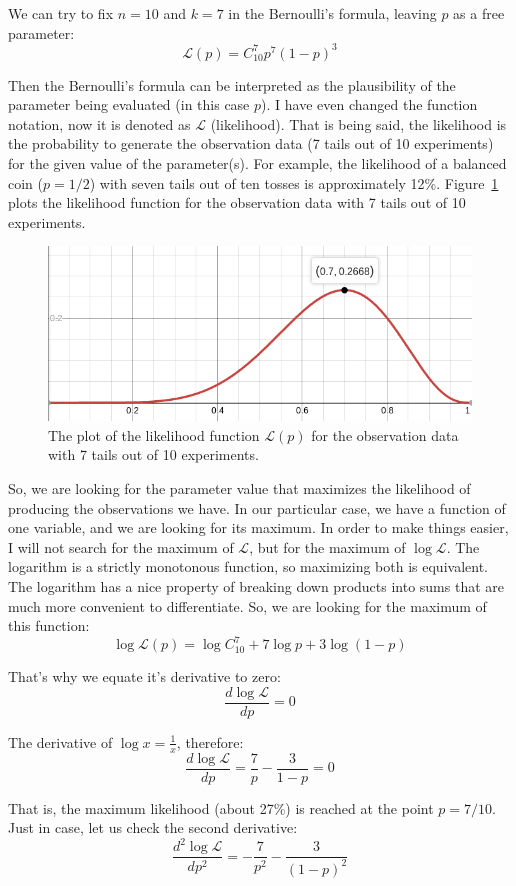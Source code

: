 \documentclass[notitlepage]{report}
\begin{document}
We can try to fix $n=10$ and $k=7$ in the Bernoulli's formula, leaving $p$ as a free parameter:
$$\mathcal{L}(p) = C_{10}^7 p^7 (1-p)^3$$

Then the Bernoulli's formula can be interpreted as the plausibility of the parameter being evaluated (in this case $p$).
I have even changed the function notation, now it is denoted as $\mathcal L$ (likelihood).
That is being said, the likelihood is the probability to generate the observation data (7 tails out of 10 experiments) for the given value of the parameter(s).
For example, the likelihood of a balanced coin ($p=1/2$) with seven tails out of ten tosses is approximately 12\%. 
Figure~\ref{fig:likelihood} plots the likelihood function for the observation data with 7 tails out of 10 experiments.

\begin{figure}[htb!]
\centering
\includegraphics[width=.5\columnwidth]{likehood-07.png}
\caption{The plot of the likelihood function $\mathcal{L}(p)$ for the observation data with 7 tails out of 10 experiments.}
\label{fig:likelihood}
\end{figure}

So, we are looking for the parameter value that maximizes the likelihood of producing the observations we have.
In our particular case, we have a function of one variable, and we are looking for its maximum.
In order to make things easier, I will not search for the maximum of $\mathcal L$, but for the maximum of $\log \mathcal L$.
The logarithm is a strictly monotonous function, so maximizing both is equivalent.
The logarithm has a nice property of breaking down products into sums that are much more convenient to differentiate.
So, we are looking for the maximum of this function:
$$\log \mathcal{L}(p) = \log C_{10}^7 + 7 \log p + 3\log (1-p)$$

That's why we equate it's derivative to zero:
$$\frac{d \log \mathcal{L}}{dp} = 0$$

The derivative of $\log x = \frac{1}{x}$, therefore:
$$\frac{d \log \mathcal{L}}{dp} = \frac{7}{p} - \frac{3}{1-p} = 0$$

That is, the maximum likelihood (about 27\%) is reached at the point $p=7/10$.
Just in case, let us check the second derivative:
$$\frac{d^2 \log \mathcal{L}}{dp^2} = -\frac{7}{p^2} - \frac{3}{(1-p)^2}$$
\end{document}

